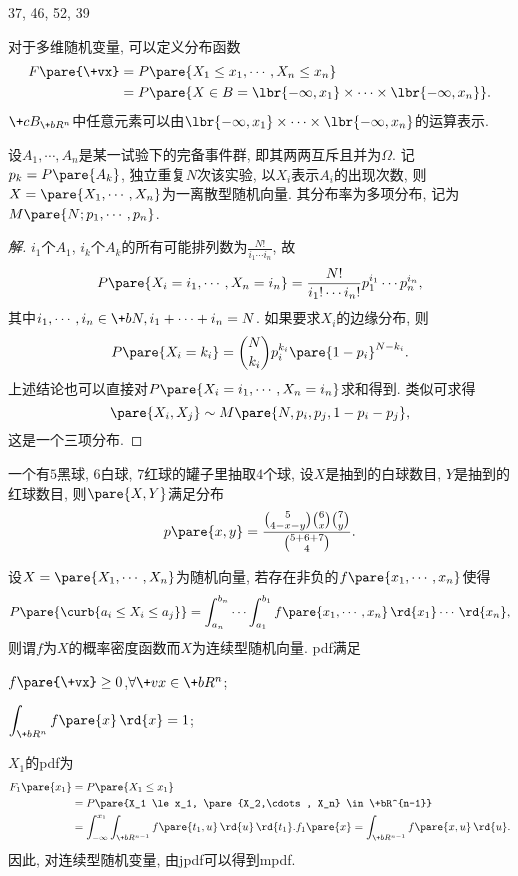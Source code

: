 \documentclass{ctexart}
\begin{document}
37, 46, 52, 39


\par
对于多维随机变量, 可以定义分布函数
\begin{align*}
    F\pare{\+vx} &= P\pare{X_1 \le x_1, \cdots, X_n \le x_n}\\ &= P\pare{X\in B = \lbr{-\infty,x_1}\times\cdots\times\lbr{-\infty, x_n}}. 
\end{align*}
$\+cB_{\+bR^n}$中任意元素可以由$\lbr{-\infty,x_1}\times\cdots\times\lbr{-\infty, x_n}$的运算表示.
\begin{sample}
    \begin{ex}
        设$A_1,\cdots,A_n$是某一试验下的完备事件群, 即其两两互斥且并为$\Omega$. 记$p_k=P\pare{A_k}$, 独立重复$N$次该实验, 以$X_i$表示$A_i$的出现次数, 则$X=\pare{X_1,\cdots,X_n}$为一离散型随机向量. 其分布率为多项分布, 记为$M\pare{N;p_1,\cdots,p_n}$.
    \end{ex}
    \begin{proof}[解]
        $i_1$个$A_1$, $i_k$个$A_k$的所有可能排列数为$\displaystyle \frac{N!}{i_1 \cdots i_n}$, 故
        \[ P\pare{X_i = i_1, \cdots, X_n = i_n} = \frac{N!}{i_1!\cdots i_n!} p_1^{i_1}\cdots p_n^{i_n}, \]
        其中$i_1,\cdots,i_n\in \+bN, i_1 + \cdots + i_n = N$. 如果要求$X_i$的边缘分布, 则
        \[ P\pare{X_i = k_i} = \binom{N}{k_i} p_i^{k_i}\pare{1-p_i}^{N-k_i}. \]
        上述结论也可以直接对$P\pare{X_i = i_1, \cdots, X_n = i_n}$求和得到. 类似可求得
        \[ \pare{X_i, X_j} \sim M\pare{N,p_i, p_j, 1-p_i-p_j}, \]
        这是一个三项分布.
    \end{proof}
\end{sample}
\begin{sample}
    \begin{ex}
        一个有$5$黑球, $6$白球, $7$红球的罐子里抽取$4$个球, 设$X$是抽到的白球数目, $Y$是抽到的红球数目, 则$\pare{X,Y}$满足分布
        \[ p\pare{x,y} = \frac{\binom{5}{4-x-y}\binom{6}{x}\binom{7}{y}}{\binom{5+6+7}{4}}. \]
    \end{ex}
\end{sample}
设$X=\pare{X_1,\cdots,X_n}$为随机向量, 若存在非负的$f\pare{x_1,\cdots,x_n}$使得
\[ P\pare{\curb{a_i \le X_i \le a_j}} = \int_{a_n}^{b_n}\cdots \int_{a_1}^{b_1} f\pare{x_1,\cdots,x_n}\,\rd{x_1}\cdots\,\rd{x_n}, \]
则谓$f$为$X$的概率密度函数而$X$为连续型随机向量. pdf满足
\begin{cenum}
    \item $f\pare{\+vx} \ge 0$,\quad $\forall \+vx \in \+bR^n$;
    \item $\displaystyle \int_{\+bR^n} f\pare{x}\,\rd{x} = 1$;
    \item $X_1$的pdf为
    \begin{align*}
        F_1\pare{x_1} &= P\pare{X_1 \le x_1} \\
        &= P\pare{X_1 \le x_1, \pare{X_2,\cdots, X_n} \in \+bR^{n-1}} \\
        &= \int_{-\infty}^{x_1}\int_{\+bR^{n-1}} f\pare{t_1,u}\,\rd{u}\,\rd{t_1}.
        f_1\pare{x} = \int_{\+bR^{n-1}} f\pare{x,u}\,\rd{u}.
    \end{align*}
    因此, 对连续型随机变量, 由jpdf可以得到mpdf.
\end{cenum}
\end{document}
